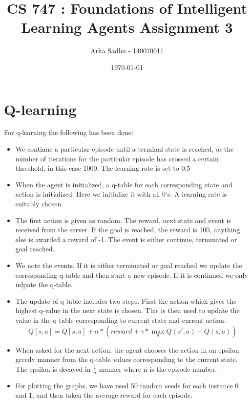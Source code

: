 \documentclass{article}
\title{CS 747 : Foundations of Intelligent Learning Agents Assignment 3}
\author{Arka Sadhu - 140070011}
\date{\today}
\begin{document}
\maketitle

\section{Q-learning}
For q-learning the following has been done:
\begin{itemize}
\item We continue a particular episode until a terminal state is reached, or the number of iterations for the particular episode has crossed a certain threshold, in this case 1000. The learning rate is set to 0.5
\item When the agent is initialized, a q-table for each corresponding state and action is initialized. Here we initialize it with all 0's. A learning rate is suitably chosen.
\item The first action is given as random. The reward, next state and event is received from the server. If the goal is reached, the reward is 100, anything else is awarded a reward of -1. The event is either continue, terminated or goal reached.
\item We note the events. If it is either terminated or goal reached we update the corresponding q-table and then start a new episode. If it is continued we only udpate the q-table.
\item The update of q-table includes two steps. First the action which gives the highest q-value in the next state is chosen. This is then used to update the value in the q-table corresponding to current state and current action.
  $$Q[s, a] = Q[s, a] + \alpha * (reward +  \gamma * \max_a Q(s', a) - Q(s, a))$$
\item When asked for the next action, the agent chooses the action in an epsilon greedy manner from the q-table values corresponding to the current state. The epsilon is decayed in $\frac{1}{n}$ manner where n is the episode number.
\item For plotting the graphs, we have used 50 random seeds for each instance 0 and 1, and then taken the average reward for each episode.
\end{itemize}

\end{document}
